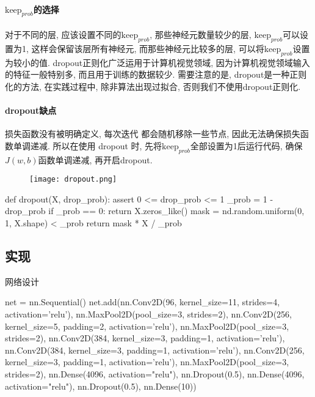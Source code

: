 \paragraph{$\text{keep}_{prob}$的选择}
对于不同的层, 应该设置不同的$\text{keep}_{prob}$, 那些神经元数量较少的层, $\text{keep}_{prob}$可以设置为1, 这样会保留该层所有神经元, 而那些神经元比较多的层, 可以将$\text{keep}_{prob}$设置为较小的值. 
dropout正则化广泛运用于计算机视觉领域, 因为计算机视觉领域输入的特征一般特别多, 而且用于训练的数据较少. 需要注意的是, dropout是一种正则化的方法, 在实践过程中, 除非算法出现过拟合, 否则我们不使用dropout正则化. 

\paragraph{dropout缺点} 损失函数没有被明确定义, 每次迭代 都会随机移除一些节点, 因此无法确保损失函数单调递减. 所以在使用 dropout 时, 先将$\text{keep}_{prob}$全部设置为1后运行代码, 确保$J(w, b)$函数单调递减, 再开启dropout. 


\begin{figure}[!ht]
\center
\texttt{[image: dropout.png]}
\end{figure}

\begin{python}
def dropout(X,  drop_prob):
    assert 0 <= drop_prob <= 1
    _{prob} = 1 - drop_prob
    if _{prob} == 0:
        return X.zeros_like()
    mask = nd.random.uniform(0,  1,  X.shape) < _{prob}
    return mask * X / _{prob}
\end{python}


\subsection{实现}

网络设计
\begin{python}
 
net = nn.Sequential()
net.add(nn.Conv2D(96,  kernel_size=11,  strides=4,  activation='relu'), 
        nn.MaxPool2D(pool_size=3,  strides=2), 
        nn.Conv2D(256,  kernel_size=5,  padding=2,  activation='relu'), 
        nn.MaxPool2D(pool_size=3,  strides=2), 
        nn.Conv2D(384,  kernel_size=3,  padding=1,  activation='relu'), 
        nn.Conv2D(384,  kernel_size=3,  padding=1,  activation='relu'), 
        nn.Conv2D(256,  kernel_size=3,  padding=1,  activation='relu'), 
        nn.MaxPool2D(pool_size=3,  strides=2), 
        nn.Dense(4096,  activation="relu"),  nn.Dropout(0.5), 
        nn.Dense(4096,  activation="relu"),  nn.Dropout(0.5), 
        nn.Dense(10))
\end{python}



